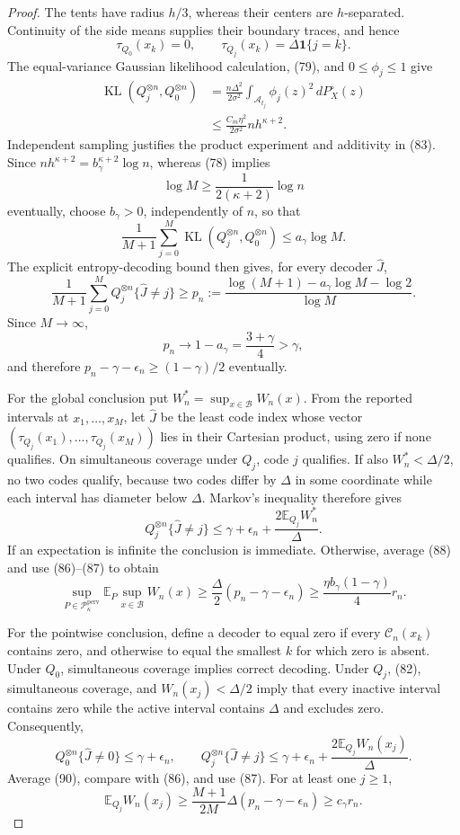 \documentclass{article}
\begin{document}
\begin{proof}
The tents have radius \(h/3\), whereas their centers are
\(h\)-separated.  Continuity of the side means supplies their boundary
traces, and hence
\[
 \tau_{Q_0}(x_k)=0,
 \qquad \tau_{Q_j}(x_k)=\Delta\mathbf1\{j=k\}.
 \tag{82}
\]
The equal-variance Gaussian likelihood calculation, (79), and
\(0\le\phi_j\le1\) give
\[
 \begin{aligned}
 \operatorname{KL}(Q_j^{\otimes n},Q_0^{\otimes n})
 &=\frac{n\Delta^2}{2\sigma^2}
   \int_{\mathcal A_{t_j}}\phi_j(z)^2\,dP_X^\circ(z)\\
 &\le\frac{C_m\eta^2}{2\sigma^2}nh^{\kappa+2}.
 \end{aligned}
 \tag{83}
\]
Independent sampling justifies the product experiment and additivity in
(83).  Since \(nh^{\kappa+2}=b_\gamma^{\kappa+2}\log n\), whereas (78)
implies
\[
 \log M\ge\frac{1}{2(\kappa+2)}\log n
 \tag{84}
\]
eventually, choose \(b_\gamma>0\), independently of \(n\), so that
\[
 \frac1{M+1}\sum_{j=0}^M
 \operatorname{KL}(Q_j^{\otimes n},Q_0^{\otimes n})
 \le a_\gamma\log M.
 \tag{85}
\]
The explicit entropy-decoding bound then gives, for every decoder
\(\widehat J\),
\[
 \frac1{M+1}\sum_{j=0}^M Q_j^{\otimes n}\{\widehat J\ne j\}
 \ge p_n:=
 \frac{\log(M+1)-a_\gamma\log M-\log2}{\log M}.
 \tag{86}
\]
Since \(M\to\infty\),
\[
 p_n\longrightarrow1-a_\gamma=\frac{3+\gamma}{4}>\gamma,
 \tag{87}
\]
and therefore \(p_n-\gamma-\epsilon_n\ge(1-\gamma)/2\) eventually.

For the global conclusion put
\(W_n^*=\sup_{x\in\mathcal B}W_n(x)\).  From the reported intervals at
\(x_1,\ldots,x_M\), let \(\widehat J\) be the least code index whose
vector \((\tau_{Q_j}(x_1),\ldots,\tau_{Q_j}(x_M))\) lies in their
Cartesian product, using zero if none qualifies.  On simultaneous
coverage under \(Q_j\), code \(j\) qualifies.  If also
\(W_n^*<\Delta/2\), no two codes qualify, because two codes differ by
\(\Delta\) in some coordinate while each interval has diameter below
\(\Delta\).  Markov's inequality therefore gives
\[
 Q_j^{\otimes n}\{\widehat J\ne j\}
 \le\gamma+\epsilon_n+
 \frac{2\mathbb E_{Q_j}W_n^*}{\Delta}.
 \tag{88}
\]
If an expectation is infinite the conclusion is immediate.  Otherwise,
average (88) and use (86)--(87) to obtain
\[
 \sup_{P\in\mathcal P_{\kappa}^{\mathrm{perv}}}
 \mathbb E_P\sup_{x\in\mathcal B}W_n(x)
 \ge\frac\Delta2(p_n-\gamma-\epsilon_n)
 \ge\frac{\eta b_\gamma(1-\gamma)}4r_n.
 \tag{89}
\]

For the pointwise conclusion, define a decoder to equal zero if every
\(\mathcal C_n(x_k)\) contains zero, and otherwise to equal the smallest
\(k\) for which zero is absent.  Under \(Q_0\), simultaneous coverage
implies correct decoding.  Under \(Q_j\), (82), simultaneous coverage,
and \(W_n(x_j)<\Delta/2\) imply that every inactive interval contains
zero while the active interval contains \(\Delta\) and excludes zero.
Consequently,
\[
 Q_0^{\otimes n}\{\widehat J\ne0\}\le\gamma+\epsilon_n,
 \qquad
 Q_j^{\otimes n}\{\widehat J\ne j\}
 \le\gamma+\epsilon_n+
 \frac{2\mathbb E_{Q_j}W_n(x_j)}\Delta.
 \tag{90}
\]
Average (90), compare with (86), and use (87).  For at least one
\(j\ge1\),
\[
 \mathbb E_{Q_j}W_n(x_j)
 \ge\frac{M+1}{2M}\Delta(p_n-\gamma-\epsilon_n)
 \ge c_\gamma r_n.
 \tag{91}
\]


\end{proof}
\end{document}
